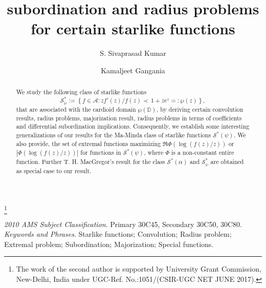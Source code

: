 \documentclass[12pt, reqno]{amsart}
\numberwithin{equation}{section}
\theoremstyle{plain}
\theoremstyle{definition}
\theoremstyle{remark}
\begin{document}
\title{subordination and radius problems for certain  starlike functions}
	\thanks{The work of the second author is supported by University Grant Commission, New-Delhi, India  under UGC-Ref. No.:1051/(CSIR-UGC NET JUNE 2017).}	
	
	\author[S. Sivaprasad Kumar]{S. Sivaprasad Kumar}
	\address{Department of Applied Mathematics, Delhi Technological University,
		Delhi--110042, India}
	
	
	\author[Kamaljeet]{Kamaljeet Gangania}
	\address{Department of Applied Mathematics, Delhi Technological University,
		Delhi--110042, India}
	

\maketitle	
	
\begin{abstract} 
	We study the following class of starlike functions $$\mathcal{S}^*_{\wp}:=\left\{f\in\mathcal{A}: {zf'(z)}/{f(z)}\prec\ 1+ze^z=:\wp(z) \right\},$$ that are associated with the cardioid domain $\wp(\mathbb{D})$, by deriving certain convolution results, radius problems, majorization result, radius problems in terms of coefficients and differential subordination implications. Consequently, we establish some interesting generalizations of our results for the Ma-Minda class of starlike functions $\mathcal{S}^{*}(\psi)$. We also provide, the set of extremal functions maximizing 
$\Re\Phi\left(\log{(f(z)/z)}\right)$ or $\left|\Phi\left(\log{(f(z)/z)}\right)\right|$
for functions in  $\mathcal{S}^{*}(\psi)$, where $\Phi$ is a non-constant entire function. Further T. H. MacGregor's result for the class $\mathcal{S}^{*}(\alpha)$ and $\mathcal{S}^*_{\wp}$ are obtained as special case to our result.
	
\end{abstract}
\vspace{0.5cm}
	\noindent \textit{2010 AMS Subject Classification}. Primary 30C45, Secondary 30C50, 30C80.\\
	\noindent \textit{Keywords and Phrases}.  Starlike functions; Convolution; Radius problem; Extremal problem; Subordination; Majorization; Special functions.

\maketitle
	
\end{document}

